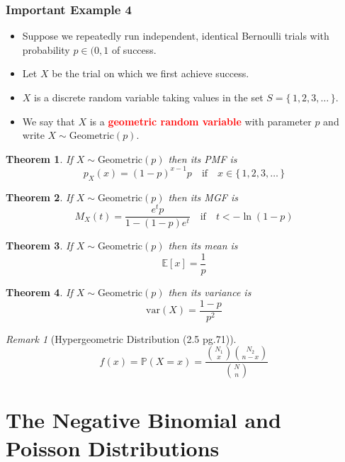 \documentclass{article}
\newcommand{\PP}{\mathbb{P}}
\newcommand{\E}{\mathbb{E}}
\newcommand{\var}{\text{var}}
\newcommand{\bfred}[1]{\textcolor{red}{\textbf{#1}}}
\theoremstyle{plain}
\newtheorem{thm}{Theorem}[section]
\theoremstyle{definition}
\theoremstyle{remark}
\newtheorem*{rem}{Remark}
\begin{document}
\subsubsection*{Important Example 4}

\begin{tcolorbox}[title = Geometric Distribution, colback = SkyBlue!5!white,colframe = SkyBlue!75!black]
    \begin{itemize}
        \item Suppose we repeatedly run independent, identical Bernoulli trials with probability $p \in (0,1$ of success.
        \item Let $X$ be the trial on which we first achieve success.
        \item $X$ is a discrete random variable taking values in the set $S = \{\,1,2,3,\dotsc\,\}$.
        \item We say that $X$ is a \bfred{geometric random variable} with parameter $p$ and write $X \sim \text{Geometric}(p)$.
    \end{itemize}
\end{tcolorbox}

\begin{thm}
    If $X \sim \text{Geometric}(p)$ then its PMF is \[p_X(x)=(1-p)^{x-1}p \quad \text{if} \quad x \in \{\,1,2,3,\dotsc\,\}\]
\end{thm}

\begin{thm}
    If $X \sim \text{Geometric}(p)$ then its MGF is \[M_X(t)=\frac{e^tp}{1-(1-p)e^t} \quad \text{if} \quad t<-\ln(1-p)\]
\end{thm}

\begin{thm}
    If $X \sim \text{Geometric}(p)$ then its mean is \[\E[x]=\frac{1}{p}\]
\end{thm}

\begin{thm}
    If $X \sim \text{Geometric}(p)$ then its variance is \[\var(X)=\frac{1-p}{p^2}\]
\end{thm}

\begin{rem}[Hypergeometric Distribution (2.5 pg.71)]
    \[f(x)=\PP(X=x)=\frac{\binom{N_1}{x}\binom{N_2}{n-x}}{\binom{N}{n}}\]
\end{rem}

\section{The Negative Binomial and Poisson Distributions}
\end{document}
